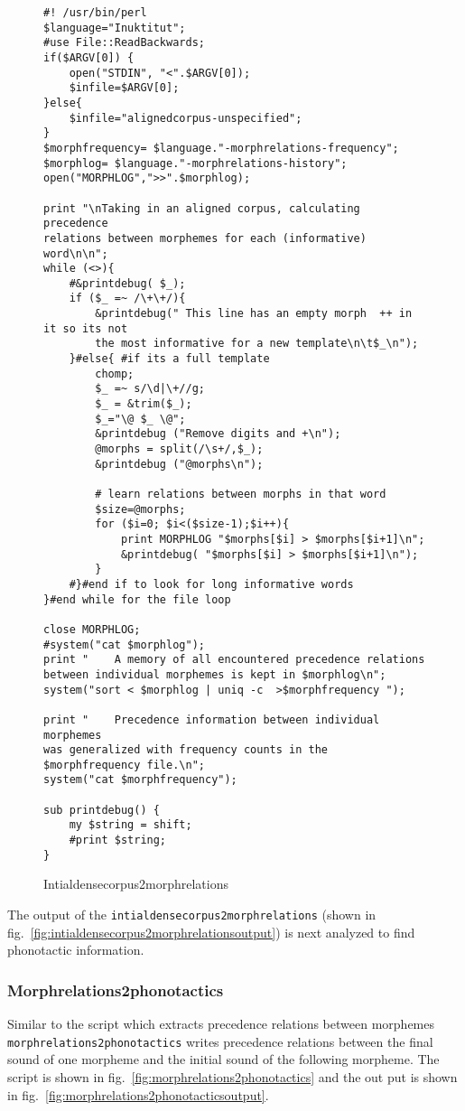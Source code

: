 \documentclass[runningheads,a4paper]{llncs}
\begin{document}
\begin{figure*}[p]
\begin{verbatim}
#! /usr/bin/perl
$language="Inuktitut";
#use File::ReadBackwards;
if($ARGV[0]) {
	open("STDIN", "<".$ARGV[0]);
	$infile=$ARGV[0];
}else{
	$infile="alignedcorpus-unspecified";
}
$morphfrequency= $language."-morphrelations-frequency";
$morphlog= $language."-morphrelations-history";
open("MORPHLOG",">>".$morphlog);

print "\nTaking in an aligned corpus, calculating precedence 
relations between morphemes for each (informative) word\n\n";
while (<>){
	#&printdebug( $_);
	if ($_ =~ /\+\+/){
		&printdebug(" This line has an empty morph  ++ in it so its not 
		the most informative for a new template\n\t$_\n");
	}#else{ #if its a full template
		chomp;
		$_ =~ s/\d|\+//g;
		$_ = &trim($_);
		$_="\@ $_ \@";
		&printdebug ("Remove digits and +\n");
		@morphs = split(/\s+/,$_);
		&printdebug ("@morphs\n");
	
		# learn relations between morphs in that word
		$size=@morphs;
		for ($i=0; $i<($size-1);$i++){
			print MORPHLOG "$morphs[$i] > $morphs[$i+1]\n";
			&printdebug( "$morphs[$i] > $morphs[$i+1]\n");
		}	
	#}#end if to look for long informative words
}#end while for the file loop

close MORPHLOG;
#system("cat $morphlog");
print "    A memory of all encountered precedence relations 
between individual morphemes is kept in $morphlog\n";
system("sort < $morphlog | uniq -c  >$morphfrequency "); 

print "    Precedence information between individual morphemes 
was generalized with frequency counts in the $morphfrequency file.\n";
system("cat $morphfrequency");

sub printdebug() {
	my $string = shift;
	#print $string;
}
\end{verbatim}
	\caption{Intialdensecorpus2morphrelations}
	\label{fig:intialdensecorpus2morphrelations}
\end{figure*}

The output of the {\tt intialdensecorpus2morphrelations} (shown in fig.~\ref{fig:intialdensecorpus2morphrelationsoutput}) is next analyzed to find phonotactic information. 


\subsubsection{Morphrelations2phonotactics}


Similar to the script which extracts precedence relations between morphemes {\tt morphrelations2phonotactics} writes precedence relations between the final sound of one morpheme and the initial sound of the following morpheme. The script is shown in fig.~\ref{fig:morphrelations2phonotactics} and the out put is shown in fig.~\ref{fig:morphrelations2phonotacticsoutput}.
\end{document}
